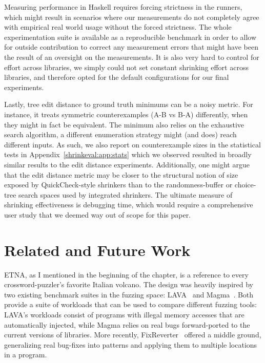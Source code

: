 Measuring performance in Haskell requires forcing strictness in the runners, which
might result in scenarios where our measurements do not completely agree with empirical
real world usage without the forced strictness. The whole experimentation suite is
available as a reproducible benchmark in order to allow for outside contribution to
correct any measurement errors that might have been the result of an oversight on the
measurements. It is also very hard to control for effort across libraries, we simply
could not set constant shrinking effort across libraries, and therefore opted for the
default configurations for our final experiments.

Lastly, tree edit distance to ground truth minimums can be a noisy metric. For
instance, it treats symmetric counterexamples (A-B vs B-A) differently, when they might
in fact be equivalent. The minimum also relies on the exhaustive search algorithm, a
different enumeration strategy might (and does) reach different inputs. As such, we
also report on counterexample sizes in the statistical tests in
Appendix~\ref{shrinkeval:app:stats} which we observed resulted in broadly similar
results to the edit distance experiments. Additionally, one might argue that the edit
distance metric may be closer to the structural notion of size exposed by
QuickCheck-style shrinkers than to the randomness-buffer or choice-tree search spaces
used by integrated shrinkers. The ultimate measure of shrinking effectiveness is
debugging time, which would require a comprehensive user study that we deemed way out
of scope for this paper.

\section{Related and Future Work}\label{sec:relwork}

ETNA, as I mentioned in the beginning of the chapter, is a reference to every
crossword-puzzler's favorite Italian volcano. The design was heavily inspired by two
existing benchmark suites in the fuzzing space: LAVA~\citep{Lava} and
Magma~\citep{Hazimeh:2020:Magma}. Both provide a suite of workloads that can be used to
compare different fuzzing tools: LAVA's workloads consist of programs with illegal
memory accesses that are automatically injected, while Magma relies on real bugs
forward-ported to the current versions of libraries. More recently,
FixReverter~\citep{FixReverter} offered a middle ground, generalizing real bug-fixes
into patterns and applying them to multiple locations in a program.

